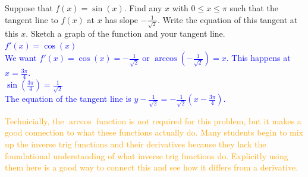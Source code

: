\documentclass{ximera}
\begin{document}
\begin{exercise}
    Suppose that $f(x)=\sin(x)$.  Find any $x$ with $0\leq x\leq \pi$ such that the tangent line to $f(x)$ at $x$ has slope $-\frac{1}{\sqrt{2}}$.  Write the equation of this tangent at this $x$.  Sketch a graph of the function and your tangent line. \\
    \textcolor{blue}{$f'(x)=\cos(x)$\\
      We want $f'(x)=\cos(x)=-\frac{1}{\sqrt{2}}$ or $\arccos(-\frac{1}{\sqrt{2}})=x$.  This happens at $x=\frac{3\pi}{4}$. \\
      $\sin(\frac{3\pi}{4})=\frac{1}{\sqrt{2}}$\\
      The equation of the tangent line is $y-\frac{1}{\sqrt{2}}=-\frac{1}{\sqrt{2}}(x-\frac{3\pi}{4})$.}\\
      \begin{center}
      \end{center}
      
      \textcolor{orange}{Technicially, the $\arccos$ function is not required for this problem, but it makes a good connection to what these functions actually do.  Many students begin to mix up the inverse trig functions and their derivatives because they lack the foundational understanding of what inverse trig functions do.  Explicitly using them here is a good way to connect this and see how it differs from a derivative.}
\end{exercise}
\end{document}
